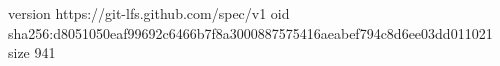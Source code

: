 version https://git-lfs.github.com/spec/v1
oid sha256:d8051050eaf99692c6466b7f8a3000887575416aeabef794c8d6ee03dd011021
size 941
